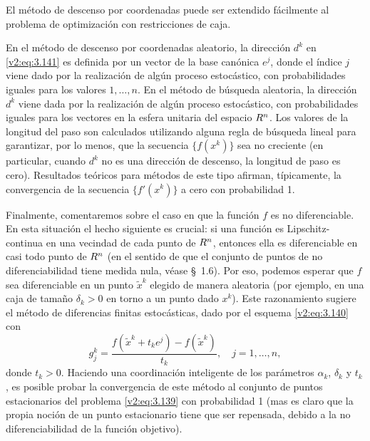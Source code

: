 El método de descenso por coordenadas puede ser extendido fácilmente al problema de optimización con restricciones de caja.

En el método de descenso por coordenadas aleatorio, la dirección $d^k$ en \eqref{v2:eq:3.141} es definida por un vector de la base canónica $e^j$, donde el índice $j$ viene dado por la realización de algún proceso estocástico, con probabilidades iguales para los valores $1, \dots, n$. En el método de búsqueda aleatoria, la dirección $d^k$ viene dada por la realización de algún proceso estocástico, con probabilidades iguales para los vectores en la esfera unitaria del espacio $R^n$. Los valores de la longitud del paso son calculados utilizando alguna regla de búsqueda lineal para garantizar, por lo menos, que la secuencia $\{f(x^k)\}$ sea no creciente (en particular, cuando $d^k$ no es una dirección de descenso, la longitud de paso es cero). Resultados teóricos para métodos de este tipo afirman, típicamente, la convergencia de la secuencia $\{f'(x^k)\}$ a cero con probabilidad 1.

Finalmente, comentaremos sobre el caso en que la función $f$ es no diferenciable. En esta situación el hecho siguiente es crucial: si una función es Lipschitz-continua en una vecindad de cada punto de $R^n$, entonces ella es diferenciable en casi todo punto de $R^n$ (en el sentido de que el conjunto de puntos de no diferenciabilidad tiene medida nula, véase \S~1.6). Por eso, podemos esperar que $f$ sea diferenciable en un punto $\tilde{x}^k$ elegido de manera aleatoria (por ejemplo, en una caja de tamaño $\delta_k > 0$ en torno a un punto dado $x^k$). Este razonamiento sugiere el método de diferencias finitas estocásticas, dado por el esquema \eqref{v2:eq:3.140} con
\[
    g_j^k = \frac{f(\tilde{x}^k + t_k e^j) - f(\tilde{x}^k)}{t_k}, \quad j = 1, \dots, n,
\]
donde $t_k > 0$. Haciendo una coordinación inteligente de los parámetros $\alpha_k$, $\delta_k$ y $t_k$, es posible probar la convergencia de este método al conjunto de puntos estacionarios del problema \eqref{v2:eq:3.139} con probabilidad 1 (mas es claro que la propia noción de un punto estacionario tiene que ser repensada, debido a la no diferenciabilidad de la función objetivo).
